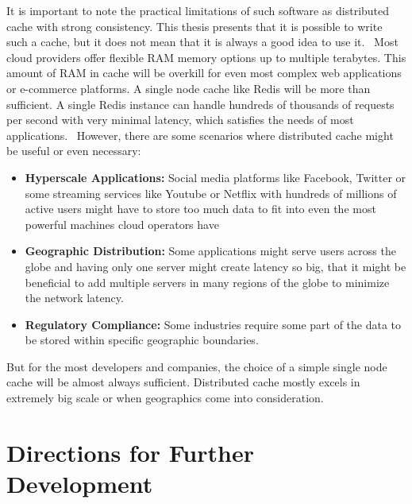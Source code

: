 \documentclass[shortabstract]{iithesis}
\begin{document}
It is important to note the practical limitations of such software as distributed cache with strong consistency. This thesis presents that it is possible to write such a cache, but it does not mean that it is always a good idea to use it. \
Most cloud providers offer flexible RAM memory options up to multiple terabytes. This amount of RAM in cache will be overkill for even most complex web applications or e-commerce platforms. A single node cache like Redis will be more than sufficient. A single Redis instance can handle hundreds of thousands of requests per second with very minimal latency, which satisfies the needs of most applications. \
However, there are some scenarios where distributed cache might be useful or even necessary:
\begin{itemize}    
    \item \textbf{Hyperscale Applications:} Social media platforms like Facebook, Twitter or some streaming services like Youtube or Netflix with hundreds of millions of active users might have to store too much data to fit into even the most powerful machines cloud operators have
    \item \textbf{Geographic Distribution:} Some applications might serve users across the globe and having only one server might create latency so big, that it might be beneficial to add multiple servers in many regions of the globe to minimize the network latency. 
    \item \textbf{Regulatory Compliance:} Some industries require some part of the data to be stored within specific geographic boundaries.
\end{itemize}

But for the most developers and companies, the choice of a simple single node cache will be almost always sufficient. Distributed cache mostly excels in extremely big scale or when geographics come into consideration.

\section{Directions for Further Development}
\end{document}
